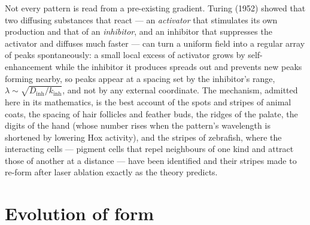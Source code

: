 \begin{proposition}\label{prop:b3:developmental-genetics:turing}
Not every pattern is read from a pre-existing gradient. Turing (1952)
showed that two diffusing substances that react --- an \emph{activator}
that stimulates its own production and that of an \emph{inhibitor},
and an inhibitor that suppresses the activator and diffuses much
faster --- can turn a uniform field into a regular array of peaks
spontaneously: a small local excess of activator grows by
self-enhancement while the inhibitor it produces spreads out and
prevents new peaks forming nearby, so peaks appear at a spacing set by
the inhibitor's range, $\lambda \sim \sqrt{D_{\text{inh}}/k_{\text{inh}}}$,
and not by any external coordinate. The mechanism, admitted here in its
mathematics, is the best account of the spots and stripes of animal
coats, the spacing of hair follicles and feather buds, the ridges of
the palate, the digits of the hand (whose number rises when the
pattern's wavelength is shortened by lowering Hox activity), and the
stripes of zebrafish, where the interacting cells --- pigment cells
that repel neighbours of one kind and attract those of another at a
distance --- have been identified and their stripes made to re-form
after laser ablation exactly as the theory predicts.
\end{proposition}
\admitted

\section{Evolution of form}

